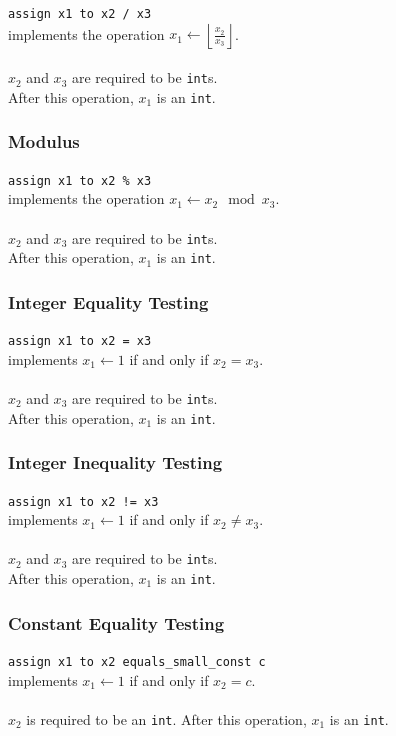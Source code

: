 \documentclass{report}
\begin{document}
\texttt{assign x1 to x2 / x3} \\
implements the operation $x_1 \leftarrow \left \lfloor{\frac{x_2}{x_3}}\right \rfloor$. \\ \\
$x_2$ and $x_3$ are required to be \texttt{int}s. \\
After this operation, $x_1$ is an \texttt{int}.

\subsubsection{Modulus} 

\texttt{assign x1 to x2 \% x3} \\
implements the operation $x_1 \leftarrow x_2\mod x_3$. \\ \\
$x_2$ and $x_3$ are required to be \texttt{int}s. \\
After this operation, $x_1$ is an \texttt{int}.

\subsubsection{Integer Equality Testing}

\texttt{assign x1 to x2 = x3} \\
implements $x_1 \leftarrow 1$ if and only if $x_2 = x_3$. \\ \\
$x_2$ and $x_3$ are required to be \texttt{int}s. \\
After this operation, $x_1$ is an \texttt{int}.

\subsubsection{Integer Inequality Testing}

\texttt{assign x1 to x2 != x3} \\
implements $x_1 \leftarrow 1$ if and only if $x_2 \not= x_3$. \\ \\
$x_2$ and $x_3$ are required to be \texttt{int}s. \\
After this operation, $x_1$ is an \texttt{int}.

\subsubsection{Constant Equality Testing}

\texttt{assign x1 to x2 equals\_small\_const c} \\
implements $x_1 \leftarrow 1$ if and only if $x_2 = c$. \\ \\
$x_2$ is required to be an \texttt{int}.
After this operation, $x_1$ is an \texttt{int}.
\end{document}
